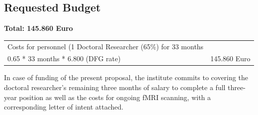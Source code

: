 \documentclass[11pt,a4paper]{article}
\begin{document}
\subsection*{Requested Budget}

\noindent\textbf{Total: 145.860 Euro}

\begin{longtable}{p{12cm} p{\dimexpr\textwidth-12cm-2\tabcolsep}}
\toprule
\endfirsthead
\endhead
Costs for personnel (1 Doctoral Researcher (65\%) for 33 months \\ 0.65 * 33 months * 6.800 (DFG rate) & 145.860 Euro \\
\bottomrule
\end{longtable}

In case of funding of the present proposal, the institute commits to covering the doctoral researcher's remaining three 
months of salary to complete a full three-year position as well as the costs for ongoing fMRI scanning, 
with a corresponding letter of intent attached.\\

\newpage

\printbibliography
\end{document}
